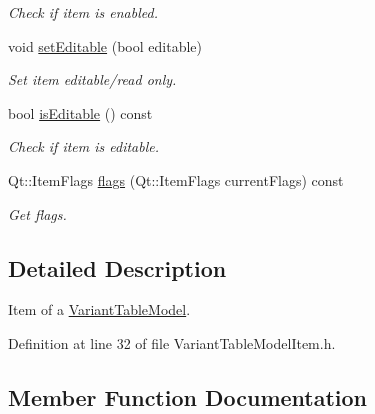 \begin{DoxyCompactItemize}
\begin{DoxyCompactList}\small\item\em Check if item is enabled. \end{DoxyCompactList}\item 
void \hyperlink{class_mdt_1_1_item_model_1_1_variant_table_model_item_a6848108f8c1dd778d273b907f06cb4a4}{set\+Editable} (bool editable)
\begin{DoxyCompactList}\small\item\em Set item editable/read only. \end{DoxyCompactList}\item 
bool \hyperlink{class_mdt_1_1_item_model_1_1_variant_table_model_item_af784c4ac31151ab9912348613067bba0}{is\+Editable} () const \hypertarget{class_mdt_1_1_item_model_1_1_variant_table_model_item_af784c4ac31151ab9912348613067bba0}{}\label{class_mdt_1_1_item_model_1_1_variant_table_model_item_af784c4ac31151ab9912348613067bba0}

\begin{DoxyCompactList}\small\item\em Check if item is editable. \end{DoxyCompactList}\item 
Qt\+::\+Item\+Flags \hyperlink{class_mdt_1_1_item_model_1_1_variant_table_model_item_af8855039323cadbeca2d557fa3424618}{flags} (Qt\+::\+Item\+Flags current\+Flags) const 
\begin{DoxyCompactList}\small\item\em Get flags. \end{DoxyCompactList}\end{DoxyCompactItemize}


\subsection{Detailed Description}
Item of a \hyperlink{class_mdt_1_1_item_model_1_1_variant_table_model}{Variant\+Table\+Model}. 

Definition at line 32 of file Variant\+Table\+Model\+Item.\+h.



\subsection{Member Function Documentation}
